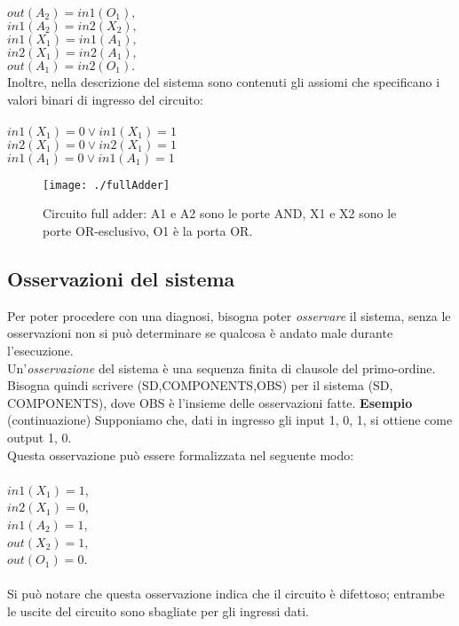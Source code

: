 \documentclass[a4paper,12pt]{report}
\begin{document}
$out(A_2) = in1(O_1),$\\
$in1(A_2) = in2(X_2),$\\
$in1(X_1) = in1(A_1),$\\
$in2(X_1) = in2(A_1),$\\
$out(A_1) = in2(O_1).$\\
\newpage
Inoltre, nella descrizione del sistema sono contenuti gli assiomi che specificano i valori binari di ingresso del circuito:\\
\\
$in1(X_1) = 0 \vee in1(X_1) = 1$\\
$in2(X_1) = 0 \vee in2(X_1) = 1$\\
$in1(A_1) = 0 \vee in1(A_1) = 1$
\begin{figure}[h]
    \begin{center}
        \texttt{[image: ./fullAdder]}
        \caption{Circuito full adder: A1 e A2 sono le porte AND, X1 e X2 sono le porte OR-esclusivo, O1 è la porta OR.}
        \label{circuito fulladder}
    \end{center}
\end{figure}
\subsection{Osservazioni del sistema}
Per poter procedere con una diagnosi, bisogna poter \textit{osservare} il sistema, senza le osservazioni non si può determinare se qualcosa è andato male durante l'esecuzione.
\\Un'\textit{osservazione} del sistema è una sequenza finita di clausole del primo-ordine. Bisogna quindi scrivere (SD,COMPONENTS,OBS) per il sistema (SD, COMPONENTS), dove OBS è l'insieme delle osservazioni fatte.
\newpage
\textbf{Esempio} (continuazione) Supponiamo che, dati in ingresso gli input 1, 0, 1, si ottiene come output 1, 0.\\
Questa osservazione può essere formalizzata nel seguente modo:\\
\\
$in1(X_1) = 1$,\\
$in2(X_1) = 0$,\\
$in1(A_2) = 1$,\\
$out(X_2) = 1$,\\
$out(O_1) = 0$.\\
\\
Si può notare che questa osservazione indica che il circuito è difettoso; entrambe le uscite del circuito sono sbagliate per gli ingressi dati.
\end{document}
